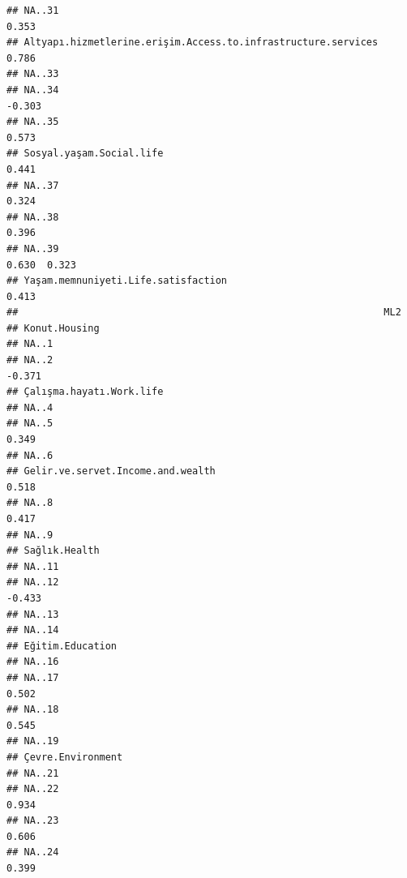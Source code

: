 \documentclass[
]{article}
\begin{document}
\begin{verbatim}
## NA..31                                                                0.353
## Altyapı.hizmetlerine.erişim.Access.to.infrastructure.services         0.786
## NA..33                                                                     
## NA..34                                                        -0.303       
## NA..35                                                         0.573       
## Sosyal.yaşam.Social.life                                              0.441
## NA..37                                                                0.324
## NA..38                                                         0.396       
## NA..39                                                         0.630  0.323
## Yaşam.memnuniyeti.Life.satisfaction                            0.413       
##                                                               ML2   
## Konut.Housing                                                       
## NA..1                                                               
## NA..2                                                         -0.371
## Çalışma.hayatı.Work.life                                            
## NA..4                                                               
## NA..5                                                          0.349
## NA..6                                                               
## Gelir.ve.servet.Income.and.wealth                              0.518
## NA..8                                                          0.417
## NA..9                                                               
## Sağlık.Health                                                       
## NA..11                                                              
## NA..12                                                        -0.433
## NA..13                                                              
## NA..14                                                              
## Eğitim.Education                                                    
## NA..16                                                              
## NA..17                                                         0.502
## NA..18                                                         0.545
## NA..19                                                              
## Çevre.Environment                                                   
## NA..21                                                              
## NA..22                                                         0.934
## NA..23                                                         0.606
## NA..24                                                         0.399

\end{verbatim}
\end{document}
